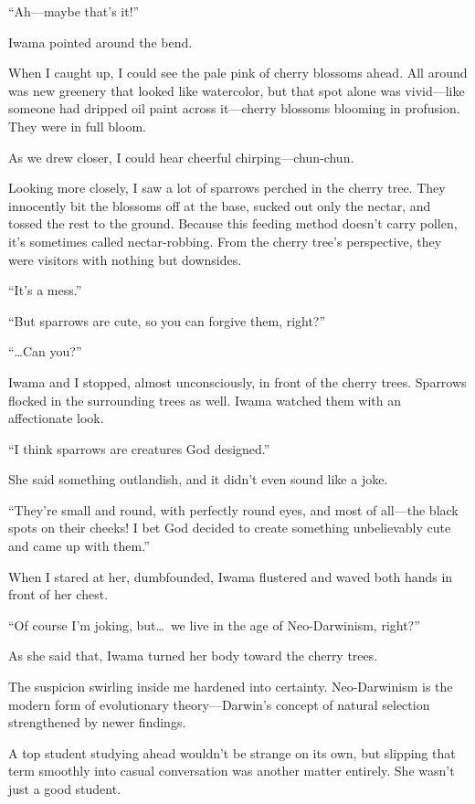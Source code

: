\documentclass[
    a4paper,
    12pt,
    twoside,
    openany,
    UTF8,
    fontset=windows
]{ctexbook}
\begin{document}
``Ah---maybe that's it!''

Iwama pointed around the bend.

When I caught up, I could see the pale pink of cherry blossoms ahead. All around was new greenery that looked like watercolor, but that spot alone was vivid---like someone had dripped oil paint across it---cherry blossoms blooming in profusion. They were in full bloom.

As we drew closer, I could hear cheerful chirping---chun-chun.

Looking more closely, I saw a lot of sparrows perched in the cherry tree. They innocently bit the blossoms off at the base, sucked out only the nectar, and tossed the rest to the ground. Because this feeding method doesn't carry pollen, it's sometimes called nectar-robbing. From the cherry tree's perspective, they were visitors with nothing but downsides.

``It's a mess.''

``But sparrows are cute, so you can forgive them, right?''

``\dots Can you?''

Iwama and I stopped, almost unconsciously, in front of the cherry trees. Sparrows flocked in the surrounding trees as well. Iwama watched them with an affectionate look.

``I think sparrows are creatures God designed.''

She said something outlandish, and it didn't even sound like a joke.

``They're small and round, with perfectly round eyes, and most of all---the black spots on their cheeks! I bet God decided to create something unbelievably cute and came up with them.''

When I stared at her, dumbfounded, Iwama flustered and waved both hands in front of her chest.

``Of course I'm joking, but\dots\ we live in the age of Neo-Darwinism, right?''

As she said that, Iwama turned her body toward the cherry trees.

The suspicion swirling inside me hardened into certainty. Neo-Darwinism is the modern form of evolutionary theory---Darwin's concept of natural selection strengthened by newer findings.

A top student studying ahead wouldn't be strange on its own, but slipping that term smoothly into casual conversation was another matter entirely. She wasn't just a good student.
\end{document}
